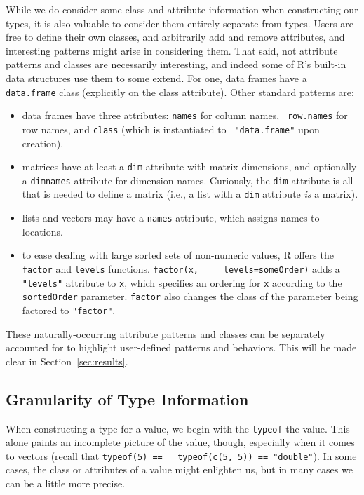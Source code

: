 \documentclass[acmsmall,10pt,review,anonymous]{acmart}\settopmatter{printfolios=true,printccs=false,printacmref=false}
\newcommand{\code}[1]{\lstinline|#1|\xspace}
\begin{document}
While we do consider some class and attribute information when constructing
our types, it is also valuable to consider them entirely separate from
types.  Users are free to define their own classes, and arbitrarily add and
remove attributes, and interesting patterns might arise in considering them.
That said, not attribute patterns and classes are necessarily interesting,
and indeed some of R's built-in data structures use them to some extend.
For one, data frames have a {\tt data.frame} class (explicitly on the class
attribute).  Other standard patterns are:

\begin{itemize}
\item data frames have three attributes: {\tt names} for column names, {\tt
  row.names} for row names, and {\tt class} (which is instantiated to {\tt
  "data.frame"} upon creation).
\item matrices have at least a {\tt dim} attribute with matrix dimensions,
  and optionally a {\tt dimnames} attribute for dimension names. Curiously,
  the {\tt dim} attribute is all that is needed to define a matrix (i.e., a
  list with a {\tt dim} attribute {\it is} a matrix).
\item lists and vectors may have a {\tt names} attribute, which assigns
  names to locations.
\item to ease dealing with large sorted sets of non-numeric values, R offers
  the \code{factor} and \code{levels} functions.  \code{factor(x,
    levels=someOrder)} adds a {\tt "levels"} attribute to \code{x}, which
  specifies an ordering for \code{x} according to the \code{sortedOrder}
  parameter.  \code{factor} also changes the class of the parameter being
  factored to \texttt{"factor"}.
\end{itemize}

These naturally-occurring attribute patterns and classes can be separately
accounted for to highlight user-defined patterns and behaviors.  This will
be made clear in Section~\ref{sec:results}.


\subsection{Granularity of Type Information}

When constructing a type for a value, we begin with the {\tt typeof} the
value.  This alone paints an incomplete picture of the value, though,
especially when it comes to vectors (recall that \code{typeof(5) ==
  typeof(c(5, 5)) == "double"}).  In some cases, the class or attributes of
a value might enlighten us, but in many cases we can be a little more
precise.
\end{document}
